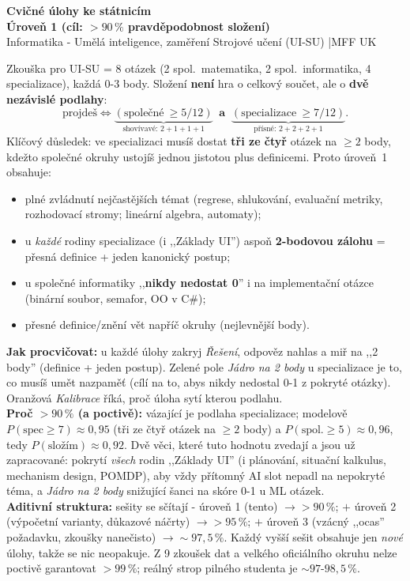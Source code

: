 \documentclass[11pt]{article}
\begin{document}
\begin{center}
  {\LARGE\bfseries\color{mffblue} Cvičné úlohy ke státnicím \\[2pt]
  Úroveň 1 \textnormal{(cíl: $>90\,\%$ pravděpodobnost složení)}}\\[4pt]
  {\small Informatika - Umělá inteligence, zaměření Strojové učení (UI-SU) \quad|\quad MFF UK}
\end{center}

\begin{infobox}[title={Jak je to zkalibrované (přečti první)}]
\footnotesize
Zkouška pro UI-SU = 8 otázek (2 spol.\ matematika, 2 spol.\ informatika, 4 specializace), každá 0-3 body.
Složení \textbf{není} hra o celkový součet, ale o \textbf{dvě nezávislé podlahy}:
\[
\text{projdeš} \iff \underbrace{(\text{společné}\ \ge 5/12)}_{\text{shovívavé: }2{+}1{+}1{+}1}\ \textbf{ a }\ \underbrace{(\text{specializace}\ \ge 7/12)}_{\text{přísné: }2{+}2{+}2{+}1}.
\]
Klíčový důsledek: ve specializaci musíš dostat \textbf{tři ze čtyř} otázek na $\ge 2$ body, kdežto společné okruhy ustojíš jednou jistotou plus definicemi. Proto úroveň~1 obsahuje:
\begin{itemize}\setlength{\itemsep}{1pt}
  \item plné zvládnutí nejčastějších témat (regrese, shlukování, evaluační metriky, rozhodovací stromy; lineární algebra, automaty);
  \item u \emph{každé} rodiny specializace (i ,,Základy UI'') aspoň \textbf{2-bodovou zálohu} = přesná definice + jeden kanonický postup;
  \item u společné informatiky ,,\textbf{nikdy nedostat 0}'' i na implementační otázce (binární soubor, semafor, OO v C\#);
  \item přesné definice/znění vět napříč okruhy (nejlevnější body).
\end{itemize}
\textbf{Jak procvičovat:} u každé úlohy zakryj \emph{Řešení}, odpověz nahlas a miř na ,,2 body'' (definice + jeden postup). Zelené pole \emph{Jádro na 2 body} u specializace je to, co musíš umět nazpaměť (cílí na to, abys nikdy nedostal 0-1 z pokryté otázky). Oranžová \emph{Kalibrace} říká, proč úloha sytí kterou podlahu.\\
\textbf{Proč $>90\,\%$ (a poctivě):} vázající je podlaha specializace; modelově $P(\text{spec}\ge7)\approx0{,}95$ (tři ze čtyř otázek na $\ge2$ body) a $P(\text{spol.}\ge5)\approx0{,}96$, tedy $P(\text{složím})\approx0{,}92$. Dvě věci, které tuto hodnotu zvedají a jsou už zapracované: pokrytí \emph{všech} rodin ,,Základy UI'' (i plánování, situační kalkulus, mechanism design, POMDP), aby vždy přítomný AI slot nepadl na nepokryté téma, a \emph{Jádro na 2 body} snižující šanci na skóre 0-1 u ML otázek.\\
\textbf{Aditivní struktura:} sešity se sčítají - úroveň 1 (tento) $\to{>}90\,\%$; $+$ úroveň 2 (výpočetní varianty, důkazové náčrty) $\to{>}95\,\%$; $+$ úroveň 3 (vzácný ,,ocas'' požadavku, zkoušky nanečisto) $\to\sim97,5\,\%$. Každý vyšší sešit obsahuje jen \emph{nové} úlohy, takže se nic neopakuje. Z 9 zkoušek dat a velkého oficiálního okruhu nelze poctivě garantovat $>99\,\%$; reálný strop pilného studenta je $\sim 97\text{-}98{,}5\,\%$.
\end{infobox}
\end{document}
